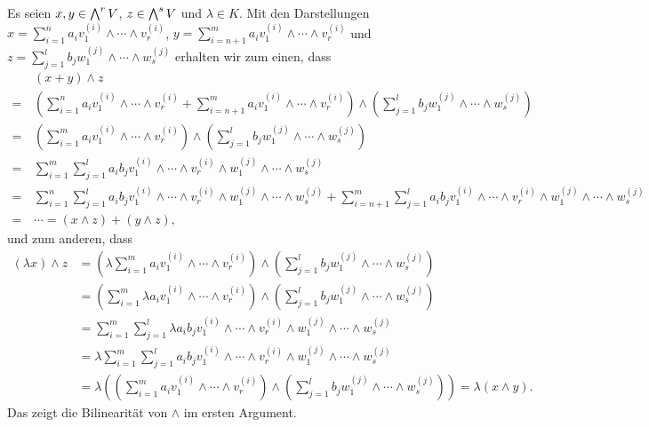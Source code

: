 Es seien $x, y \in \bigwedge^{r} V$, $z \in \bigwedge^{s} V$ und $\lambda \in K$.
Mit den Darstellungen $x = \sum_{i=1}^n a_i v^{(i)}_1 \wedge \dotsb \wedge v^{(i)}_r$, $y = \sum_{i=n+1}^m a_i v^{(i)}_1 \wedge \dotsb \wedge v^{(i)}_r$ und $z = \sum_{j=1}^l b_j w^{(j)}_1 \wedge \dotsb \wedge w^{(j)}_s$ erhalten wir zum einen, dass
\begin{align*}
   &\,  (x + y) \wedge z
  \\
  =&\,  \left(
            \sum_{i=1}^n a_i v^{(i)}_1 \wedge \dotsb \wedge v^{(i)}_r
          + \sum_{i=n+1}^m a_i v^{(i)}_1 \wedge \dotsb \wedge v^{(i)}_r
        \right)
        \wedge
        \left(
          \sum_{j=1}^l b_j w^{(j)}_1 \wedge \dotsb \wedge w^{(j)}_s
        \right)
  \\
  =&\,  \left(
          \sum_{i=1}^m a_i v^{(i)}_1 \wedge \dotsb \wedge v^{(i)}_r
        \right)
        \wedge
        \left(
          \sum_{j=1}^l b_j w^{(j)}_1 \wedge \dotsb \wedge w^{(j)}_s
        \right)
  \\
  =&\,  \sum_{i=1}^m \sum_{j=1}^l a_i b_j v^{(i)}_1 \wedge \dotsb \wedge v^{(i)}_r \wedge w^{(j)}_1 \wedge \dotsb \wedge w^{(j)}_s
  \\
  =&\,    \sum_{i=1}^n \sum_{j=1}^l a_i b_j v^{(i)}_1 \wedge \dotsb \wedge v^{(i)}_r \wedge w^{(j)}_1 \wedge \dotsb \wedge w^{(j)}_s
        + \sum_{i=n+1}^m \sum_{j=1}^l a_i b_j v^{(i)}_1 \wedge \dotsb \wedge v^{(i)}_r \wedge w^{(j)}_1 \wedge \dotsb \wedge w^{(j)}_s
  \\
  =&\,  \dotsb
  =     (x \wedge z) + (y \wedge z),
\end{align*}
und zum anderen, dass
\begin{align*}
    (\lambda x) \wedge z
  &=  \left(
        \lambda
        \sum_{i=1}^m a_i v^{(i)}_1 \wedge \dotsb \wedge v^{(i)}_r
      \right)
      \wedge
      \left(
        \sum_{j=1}^l b_j w^{(j)}_1 \wedge \dotsb \wedge w^{(j)}_s
      \right)
  \\
  &=  \left(
        \sum_{i=1}^m \lambda a_i v^{(i)}_1 \wedge \dotsb \wedge v^{(i)}_r
      \right)
      \wedge
      \left(
        \sum_{j=1}^l b_j w^{(j)}_1 \wedge \dotsb \wedge w^{(j)}_s
      \right)
  \\
  &=  \sum_{i=1}^m \sum_{j=1}^l \lambda a_i b_j
                               v^{(i)}_1 \wedge \dotsb \wedge v^{(i)}_r \wedge w^{(j)}_1 \wedge \dotsb \wedge w^{(j)}_s
  \\
  &=  \lambda \sum_{i=1}^m \sum_{j=1}^l a_i b_j
                               v^{(i)}_1 \wedge \dotsb \wedge v^{(i)}_r \wedge w^{(j)}_1 \wedge \dotsb \wedge w^{(j)}_s
  \\  
  &=  \lambda \left(
                \left(
                  \sum_{i=1}^m a_i v^{(i)}_1 \wedge \dotsb \wedge v^{(i)}_r
                \right)
                \wedge
                \left(
                  \sum_{j=1}^l b_j w^{(j)}_1 \wedge \dotsb \wedge w^{(j)}_s
                \right)
              \right)
  = \lambda (x \wedge y).
\end{align*}
Das zeigt die Bilinearität von $\wedge$ im ersten Argument.

